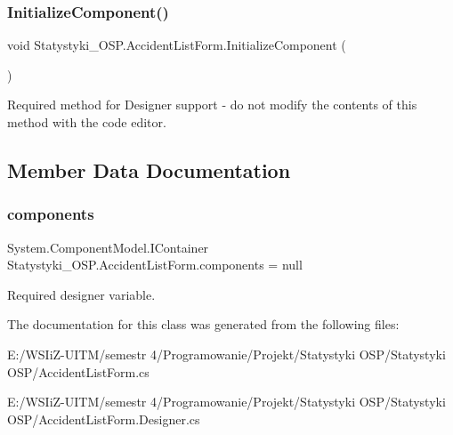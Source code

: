 \subsubsection{\texorpdfstring{InitializeComponent()}{InitializeComponent()}}
{\footnotesize\ttfamily void Statystyki\+\_\+\+O\+S\+P.\+Accident\+List\+Form.\+Initialize\+Component (\begin{DoxyParamCaption}{ }\end{DoxyParamCaption})\hspace{0.3cm}{\ttfamily [private]}}



Required method for Designer support -\/ do not modify the contents of this method with the code editor. 



\subsection{Member Data Documentation}
\mbox{\label{class_statystyki___o_s_p_1_1_accident_list_form_acfc9bd253e3fad1c140881dbffbf5e6b}} 
\subsubsection{\texorpdfstring{components}{components}}
{\footnotesize\ttfamily System.\+Component\+Model.\+I\+Container Statystyki\+\_\+\+O\+S\+P.\+Accident\+List\+Form.\+components = null\hspace{0.3cm}{\ttfamily [private]}}



Required designer variable. 



The documentation for this class was generated from the following files\+:\begin{DoxyCompactItemize}
\item 
E\+:/\+W\+S\+Ii\+Z-\/\+U\+I\+T\+M/semestr 4/\+Programowanie/\+Projekt/\+Statystyki O\+S\+P/\+Statystyki O\+S\+P/Accident\+List\+Form.\+cs\item 
E\+:/\+W\+S\+Ii\+Z-\/\+U\+I\+T\+M/semestr 4/\+Programowanie/\+Projekt/\+Statystyki O\+S\+P/\+Statystyki O\+S\+P/Accident\+List\+Form.\+Designer.\+cs\end{DoxyCompactItemize}
